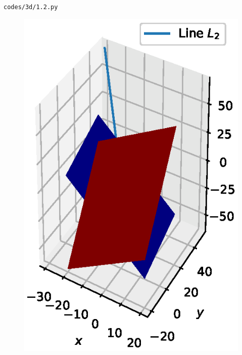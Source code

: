 \begin{enumerate}[label=\arabic*.,ref=\thesubsection.\theenumi]
\begin{lstlisting}
codes/3d/1.2.py
\end{lstlisting}
\begin{figure}[!ht]
\centering
\includegraphics[width=\columnwidth]{./3d/figs/1.2.eps}
\caption{}
\label{fig:1.2}
\end{figure}


\end{enumerate}

